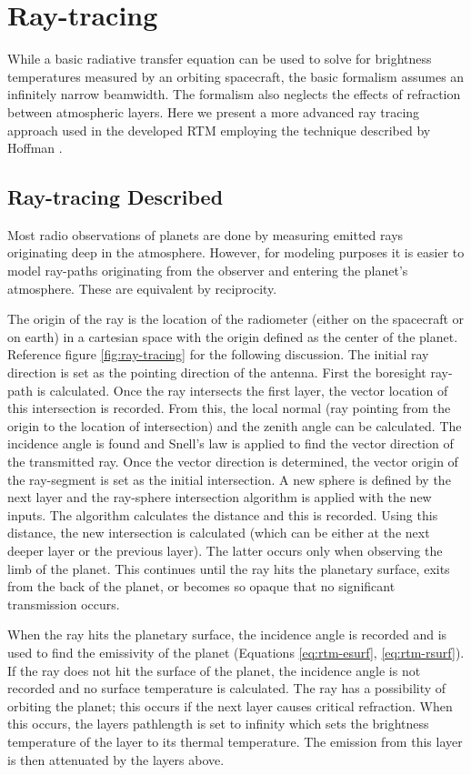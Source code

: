 \section{Ray-tracing}
While a basic radiative transfer equation can be used to solve for brightness temperatures measured by an orbiting spacecraft, the basic formalism assumes an infinitely narrow beamwidth. The formalism also neglects the effects of refraction between atmospheric layers. Here we present a more advanced ray tracing approach used in the developed RTM employing the technique described by Hoffman \cite{Hoffman-thesis}.
\subsection{Ray-tracing Described}
Most radio observations of planets are done by measuring emitted rays originating deep in the atmosphere. However, for modeling purposes it is easier to model ray-paths originating from the observer and entering the planet's atmosphere. These are equivalent by reciprocity.

The origin of the ray is the location of the radiometer (either on the spacecraft or on earth) in a cartesian space with the origin defined as the center of the planet. Reference figure \ref{fig:ray-tracing} for the following discussion. The initial ray direction is set as the pointing direction of the antenna. First the boresight ray-path is calculated.  Once the ray intersects the first layer, the vector location of this intersection is recorded. From this, the local normal (ray pointing from the origin to the location of intersection) and the zenith angle can be calculated. The incidence angle is found and Snell's law is applied to find the vector direction of the transmitted ray. Once the vector direction is determined, the vector origin of the ray-segment is set as the initial intersection. A new sphere is defined by the next layer and the ray-sphere intersection algorithm is applied with the new inputs. The algorithm calculates the distance and this is recorded. Using this distance, the new intersection is calculated (which can be either at the next deeper layer or the previous layer). The latter occurs only when observing the limb of the planet. This continues until the ray hits the planetary surface, exits from the back of the planet, or becomes so opaque that no significant transmission occurs. 

When the ray hits the planetary surface, the incidence angle is recorded and is used to find the emissivity of the planet (Equations \ref{eq:rtm-esurf}, \ref{eq:rtm-rsurf}). If the ray does not hit the surface of the planet, the incidence angle is not recorded and no surface temperature is calculated. The ray has a possibility of orbiting the planet; this occurs if the next layer causes critical refraction. When this occurs, the layers pathlength is set to infinity which sets the brightness temperature of the layer to its thermal temperature. The emission from this layer is then attenuated by the layers above.

